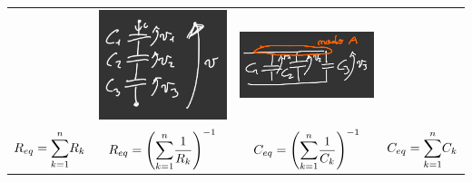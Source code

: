 \documentclass{article}
\begin{document}
\begin{center}
\begin{tabular}{c c c c}
        &
        \includegraphics[scale=0.37]{Image/Condensatori in serie.png}
        &
        \includegraphics[scale=0.37]{Image/Condensatori in parallelo.png}
        \\
        $R_{eq} = \mathlarger{\sum}_{k=1}^{n}R_k$
        &
        $R_{eq}= \left(\mathlarger{\sum}_{k=1}^n \dfrac{1}{R_k} \right)^{-1} $
        &
        $C_{eq} = \left( \mathlarger{\sum}_{k=1}^{n} \dfrac{1}{C_k} \right)^{-1}$
        &
        $C_{eq} = \mathlarger{\sum}_{k=1}^nC_k$
    \end{tabular}
\end{center}
\end{document}
